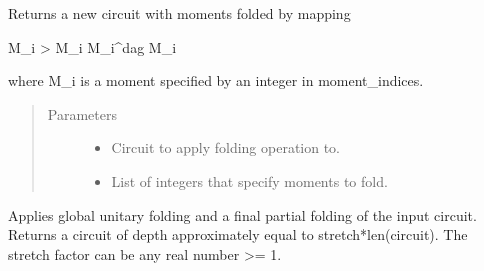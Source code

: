 \documentclass[letterpaper,10pt,english]{sphinxmanual}
\begin{document}

\begin{fulllineitems}
\label{\detokenize{apidoc:mitiq.folding_cirq.fold_moments}}
Returns a new circuit with moments folded by mapping

M\_i \sphinxhyphen{}\textgreater{} M\_i M\_i\textasciicircum{}dag M\_i

where M\_i is a moment specified by an integer in moment\_indices.
\begin{quote}\begin{description}
\item[{Parameters}] \leavevmode\begin{itemize}
\item {} 
 \sphinxhyphen{}\sphinxhyphen{} Circuit to apply folding operation to.

\item {} 
 \sphinxhyphen{}\sphinxhyphen{} List of integers that specify moments to fold.

\end{itemize}

\end{description}\end{quote}

\end{fulllineitems}


\begin{fulllineitems}
\label{\detokenize{apidoc:mitiq.folding_cirq.unitary_folding}}
Applies global unitary folding and a final partial folding of the input circuit.
Returns a circuit of depth approximately equal to stretch*len(circuit).
The stretch factor can be any real number \textgreater{}= 1.

\end{fulllineitems}
\end{document}
